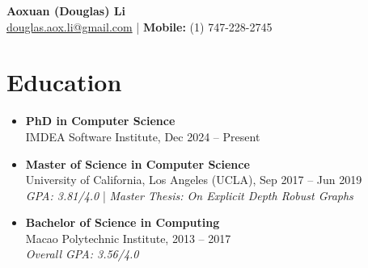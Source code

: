 \documentclass[a4paper,12pt]{article}
\begin{document}


\begin{center}
    \textbf{\huge Aoxuan (Douglas) Li} \\
    \vspace{0.5em}
    \small \href{mailto:douglas.aox.li@gmail.com}{douglas.aox.li@gmail.com} | \textbf{Mobile:} (1) 747-228-2745 \\
\end{center}

\section*{Education}
\begin{itemize}[left=0pt, label={}]
    \item \textbf{PhD in Computer Science} \\
    IMDEA Software Institute, Dec 2024 -- Present
    \item \textbf{Master of Science in Computer Science} \\
    University of California, Los Angeles (UCLA), Sep 2017 -- Jun 2019 \\
    \emph{GPA: 3.81/4.0} | \textit{Master Thesis: On Explicit Depth Robust Graphs}
    \item \textbf{Bachelor of Science in Computing} \\
    Macao Polytechnic Institute, 2013 -- 2017 \\
    \emph{Overall GPA: 3.56/4.0}
\end{itemize}
\end{document}
